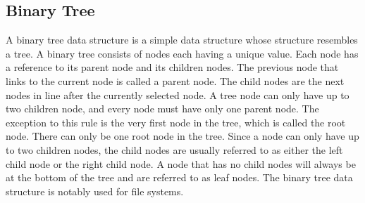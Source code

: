\subsection{Binary Tree}
A binary tree data structure is a simple data structure whose structure resembles a tree. A binary tree consists of nodes each having a unique value. Each node has a reference to its parent node and its children nodes. The previous node that links to the current node is called a parent node. The child nodes are the next nodes in line after the currently selected node. A tree node can only have up to two children node, and every node must have only one parent node. The exception to this rule is the very first node in the tree, which is called the root node. There can only be one root node in the tree. Since a node can only have up to two children nodes, the child nodes are usually referred to as either the left child node or the right child node. A node that has no child nodes will always be at the bottom of the tree and are referred to as leaf nodes. The binary tree data structure is notably used for file systems.